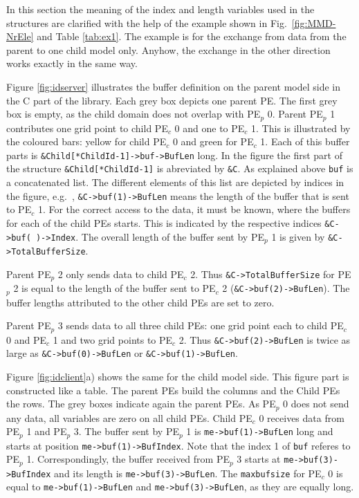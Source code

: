 \documentclass[twoside]{article}
\begin{document}
In this section the meaning of the index and length variables used in the
structures are clarified with the help of the example shown in Fig.\ 
\ref{fig:MMD-NrEle} and Table \ref{tab:ex1}. The example is for the
exchange from data from the parent to one child model only. Anyhow,
the exchange in the other direction works exactly in the same way.

Figure \ref{fig:idserver} illustrates the buffer definition on the
parent model side in the C part of the library. Each grey box depicts
one parent PE. 
The first grey box is empty, as the child domain does not overlap with 
PE$_p$ 0. Parent PE$_p$ 1 contributes one grid point to child PE$_c$ 0 and one
to PE$_c$ 1. This is illustrated by the coloured bars: yellow for child PE$_c$ 0
and green for PE$_c$ 1. Each of this buffer parts is 
\verb|&Child[*ChildId-1]->buf->BufLen| long. In the figure the first part
of the structure \verb|&Child[*ChildId-1]| is abreviated by \verb|&C|.
As explained above \verb|buf| is a concatenated list. The different elements 
of this list are depicted by indices in the figure, e.g.\ ,
\verb|&C->buf(1)->BufLen| means the length of the buffer that is sent to PE$_c$ 
1.  For the correct access to the data, it must be known, where the buffers for
each of the child PEs starts. This is indicated by the respective indices
\verb|&C->buf( )->Index|. The overall length of the buffer sent by PE$_p$ 1 is
given by \verb|&C->TotalBufferSize|.

Parent PE$_p$ 2 only sends data to child PE$_c$ 2. Thus 
\verb|&C->TotalBufferSize| for PE$_p$ 2 is equal to the length of the
buffer sent 
to PE$_c$ 2 (\verb|&C->buf(2)->BufLen|). The buffer lengths attributed to the
other child PEs are set to zero.

Parent PE$_p$ 3 sends data to all three child PEs: one grid point each to 
child PE$_c$ 0 and  PE$_c$ 1 and two grid points to PE$_c$ 2. Thus 
\verb|&C->buf(2)->BufLen| is twice as large as \verb|&C->buf(0)->BufLen| or
\verb|&C->buf(1)->BufLen|.


Figure \ref{fig:idclient}a) shows the same for the child model
side. This figure part is 
constructed like a table. The parent PEs build the columns and the Child PEs 
the rows. The grey boxes indicate again the parent PEs. As PE$_p$ 0 does not
send any data, all variables are zero on all child PEs. 
Child PE$_c$ 0 receives data from PE$_p$ 1 and PE$_p$ 3. The buffer sent by
PE$_p$ 1 is \verb|me->buf(1)->BufLen| long and starts at position 
\verb|me->buf(1)->BufIndex|. Note that the index 1 of \verb|buf| referes to
 PE$_p$ 1. 
Correspondingly, the buffer received from PE$_p$ 3 starts at 
\verb|me->buf(3)->BufIndex| and its length is \verb|me->buf(3)->BufLen|.
The \verb|maxbufsize| for  PE$_c$ 0 is equal to \verb|me->buf(1)->BufLen| and
\verb|me->buf(3)->BufLen|, as they are equally long.
\end{document}
